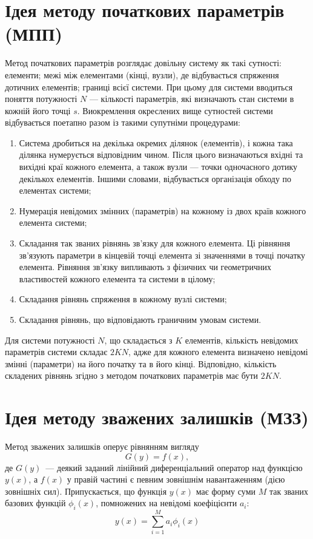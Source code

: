 \documentclass{mathreport}
\begin{document}
\section{Ідея методу початкових параметрів (МПП)}

Метод початкових параметрів розглядає довільну систему як такі сутності: елементи; межі між елементами (кінці, вузли), де відбувається спряження дотичних елементів; границі всієї системи. При цьому для системи вводиться поняття потужності $N$ --- кількості параметрів, які визначають стан системи в кожній його точці $s$. Виокремлення окреслених вище сутностей системи відбувається поетапно разом із такими супутніми процедурами:

\begin{enumerate}
    \item Система дробиться на декілька окремих ділянок (елементів), і кожна така ділянка нумерується відповідним чином. Після цього визначаються вхідні та вихідні краї кожного елемента, а також вузли --- точки одночасного дотику декількох елементів. Іншими словами, відбувається організація обходу по елементах системи;
    \item Нумерація невідомих змінних (параметрів) на кожному із двох країв кожного елемента системи;
    \item Складання так званих рівнянь зв’язку для кожного елемента. Ці рівняння зв’язують параметри в кінцевій точці елемента зі значеннями в точці початку елемента. Рівняння зв'язку випливають з фізичних чи геометричних властивостей кожного елемента та системи в цілому;
    \item Складання рівнянь спряження в кожному вузлі системи;
    \item Складання рівнянь, що відповідають граничним умовам системи.
\end{enumerate}

Для системи потужності $N$, що складається з $K$ елементів, кількість невідомих параметрів системи складає $2KN$, адже для кожного елемента визначено невідомі змінні (параметри) на його початку та в його кінці. Відповідно, кількість складених рівнянь згідно з методом початкових параметрів має бути $2KN$.  

\section{Ідея методу зважених залишків (МЗЗ)}

Метод зважених залишків оперує рівнянням вигляду
\begin{equation}\label{eq: G(y) = f(x)}
    G(y) = f(x),
\end{equation}
де $G(y)$~--- деякий заданий лінійний диференціальний оператор над функцією $y(x)$, а $f(x)$ у правій частині є певним зовнішнім навантаженням (дією зовнішніх сил). Припускається, що функція $y(x)$ має форму суми $M$ так званих базових функцій $\phi_i(x)$, помножених на невідомі коефіцієнти $a_i$:
\begin{equation}\label{eq: y(x) approximation}
    y(x) = \sum\limits_{i=1}^{M} a_i\phi_i(x)
\end{equation}
\end{document}
